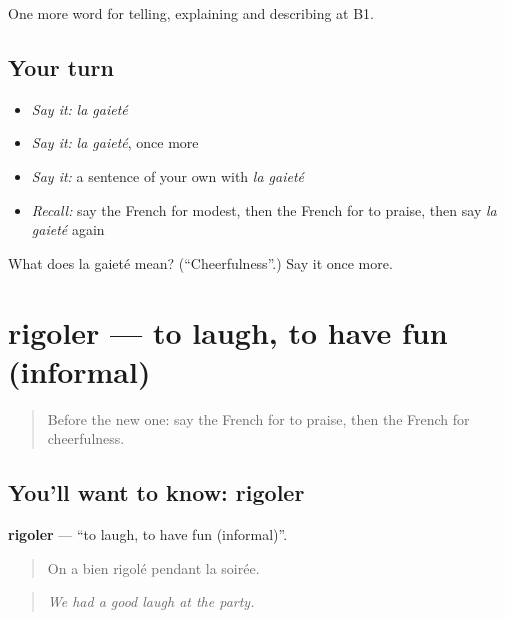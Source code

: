 \begin{grammarlens}[title={What you've built}]
One more word for telling, explaining and describing at B1.
\end{grammarlens}

\subsection*{Your turn}
\begin{itemize}
\raggedright
  \item \emph{Say it:} \emph{la gaieté}
  \item \emph{Say it:} \emph{la gaieté}, once more
  \item \emph{Say it:} a sentence of your own with \emph{la gaieté}
  \item \emph{Recall:} say the French for modest, then the French for to praise, then say \emph{la gaieté} again
\end{itemize}

\begin{tcolorbox}[breakable,colback=teal!4,colframe=teal!35!black,title={Before you move on}]
What does la gaieté mean? (\textquotedblleft{}Cheerfulness\textquotedblright{}.) Say it once more.
\end{tcolorbox}
\section[rigoler]{rigoler — to laugh, to have fun (informal)}

\label{lesson:FR-C474-rigoler}



\begin{quote}
Before the new one: say the French for to praise, then the French for cheerfulness.
\end{quote}

\subsection*{You'll want to know: rigoler}
\textbf{rigoler} — \textquotedblleft{}to laugh, to have fun (informal)\textquotedblright{}.

\begin{quote}
On a bien rigolé pendant la soirée.
\end{quote}

\begin{quote}
\emph{We had a good laugh at the party.}
\end{quote}

